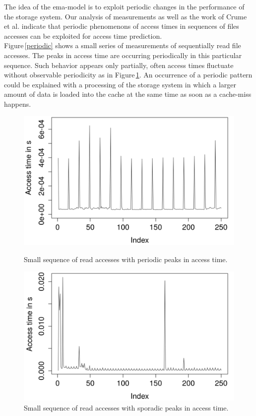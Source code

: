 \documentclass{superfri}
\begin{document}
The idea of the ema-model is to exploit periodic changes in the performance of the storage system.
Our analysis of measurements as well as the work of Crume et al. \cite{Crume:2013:FML:2538542.2538561} indicate that periodic phenomenons of access times in sequences of files accesses can be exploited for access time prediction.\\
Figure\,\ref{periodic} shows a small series of measurements of sequentially read file accesses.
The peaks in access time are occurring periodically in this particular sequence. Such behavior appears only partially, often access times fluctuate without observable periodicity as in Figure\,\ref{sporadic}.
An occurrence of a periodic pattern could be explained with a processing of the storage system in which a larger amount of data is loaded into the cache at the same time as soon as a cache-miss happens.
\begin{figure}[!h]
	\centering
	\begin{minipage}[b]{0.47\textwidth}
		\includegraphics[width=\textwidth]{src/plot_From100001to100250_read_seq.png}
		\caption{Small sequence of read accesses with periodic peaks in access time.}
		\label{periodic}
	\end{minipage}
	\hfill
	\begin{minipage}[b]{0.47\textwidth}
		\includegraphics[width=\textwidth]{src/plot_First250_read_seq.png}
		\caption{Small sequence of read accesses with sporadic peaks in access time.}
		\label{sporadic}
	\end{minipage}
\end{figure}
\end{document}
